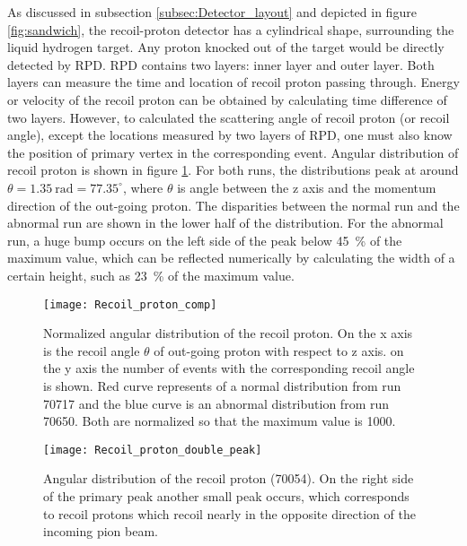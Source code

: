 \label{subsec:recoil_proton}
As discussed in subsection \ref{subsec:Detector_layout} and depicted in figure \ref{fig:sandwich}, the recoil-proton detector has a cylindrical shape, surrounding the liquid hydrogen target. Any proton knocked out of the target would be directly detected by RPD. RPD contains two layers: inner layer and outer layer. Both layers can measure the time and location of recoil proton passing through. Energy or velocity of the recoil proton can be obtained by calculating time difference of two layers. However, to calculated the scattering angle of recoil proton (or recoil angle), except the locations measured by two layers of RPD, one must also know the position of primary vertex in the corresponding event. Angular distribution of recoil proton is shown in figure \ref{fig:Recoil_proton_comp}. For both runs, the distributions peak at around $\theta=\SI{1.35}{\radian} = 77.35^{\circ}$, where $\theta$ is angle between the z axis and the momentum direction of the out-going proton. The disparities between the normal run and the abnormal run are shown in the lower half of the distribution. For the abnormal run, a huge bump occurs on the left side of the peak below \SI{45}{\percent} of the maximum value, which can be reflected numerically by calculating the width of a certain height, such as \SI{23}{\percent} of the maximum value.

\begin{figure}[!b]
	\centering
	\texttt{[image: Recoil\_proton\_comp]}
	\caption{Normalized angular distribution of the recoil proton. On the x axis is the recoil angle $\theta$ of out-going proton with respect to z axis. on the y axis the number of events with the corresponding recoil angle is shown. Red curve represents of a normal distribution from run 70717 and the blue curve is an abnormal distribution from run 70650. Both are normalized so that the maximum value is 1000. }
	\label{fig:Recoil_proton_comp}
\end{figure}

\begin{figure}[!b]
	\centering
	\texttt{[image: Recoil\_proton\_double\_peak]}
	\caption{Angular distribution of the recoil proton (70054). On the right side of the primary peak another small peak occurs, which corresponds to recoil protons which recoil nearly in the opposite direction of the incoming pion beam. }
	\label{fig:Recoil_proton_double_peak}
\end{figure}

